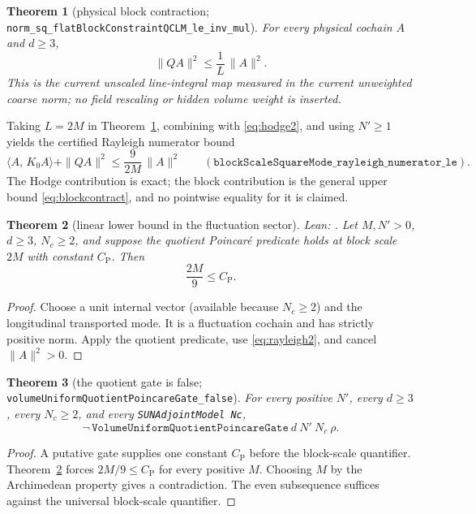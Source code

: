 \documentclass[11pt]{article}
\newtheorem{theorem}{Theorem}[section]
\theoremstyle{definition}
\newcommand{\lean}[1]{\texttt{#1}}
\newcommand{\CP}{C_{\mathrm{P}}}
\newcommand{\inn}[2]{\langle #1,\, #2\rangle}
\begin{document}
\begin{theorem}[physical block contraction;
\lean{norm\_sq\_flatBlockConstraintQCLM\_le\_inv\_mul}]
\label{thm:blockcontract}
For every physical cochain $A$ and $d\ge3$,
\begin{equation}\label{eq:blockcontract}
 \|QA\|^2 \le \frac{1}{L}\,\|A\|^2.
\end{equation}
This is the current unscaled line-integral map measured in the current
unweighted coarse norm; no field rescaling or hidden volume weight is
inserted.
\end{theorem}

Taking $L=2M$ in Theorem~\ref{thm:blockcontract}, combining with
\eqref{eq:hodge2}, and using $N'\ge1$ yields the certified Rayleigh
numerator bound
\begin{equation}\label{eq:rayleigh2}
 \inn{A}{K_0A}+\|QA\|^2
 \le \frac{9}{2M}\,\|A\|^2
 \qquad
 (\lean{blockScaleSquareMode\_rayleigh\_numerator\_le}).
\end{equation}
The Hodge contribution is exact; the block contribution is the general
upper bound \eqref{eq:blockcontract}, and no pointwise equality for it is
claimed.

\begin{theorem}[linear lower bound in the fluctuation sector]
\label{thm:quotlower}
\emph{Lean:} .
Let $M,N'>0$, $d\ge3$, $N_c\ge2$, and suppose the quotient Poincar\'e
predicate holds at block scale $2M$ with constant $\CP$.  Then
\[
 \frac{2M}{9}\le \CP.
\]
\end{theorem}

\begin{proof}
Choose a unit internal vector (available because $N_c\ge2$) and the
longitudinal transported mode.  It is a fluctuation cochain and has
strictly positive norm.  Apply the quotient predicate, use
\eqref{eq:rayleigh2}, and cancel $\|A\|^2>0$.
\end{proof}

\begin{theorem}[the quotient gate is false;
\lean{volumeUniformQuotientPoincareGate\_false}]
\label{thm:quotgatefalse}
For every positive $N'$, every $d\ge3$, every $N_c\ge2$, and every
\lean{SUNAdjointModel Nc},
\[
 \neg\,\lean{VolumeUniformQuotientPoincareGate}\ d\ N'\ N_c\ \rho.
\]
\end{theorem}

\begin{proof}
A putative gate supplies one constant $\CP$ before the block-scale
quantifier.  Theorem~\ref{thm:quotlower} forces $2M/9\le\CP$ for every
positive $M$.  Choosing $M$ by the Archimedean property gives a
contradiction.  The even subsequence suffices against the universal
block-scale quantifier.
\end{proof}
\end{document}
